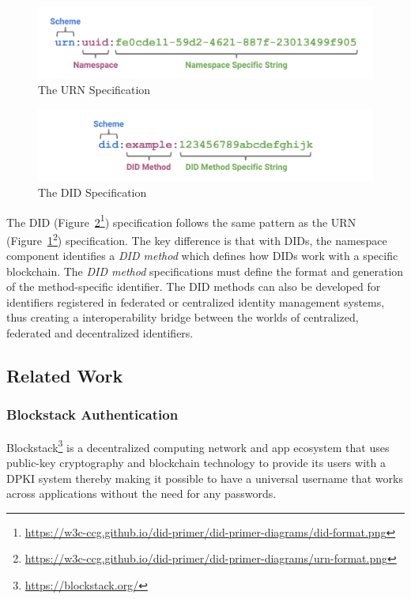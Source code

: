 		\begin{figure}[h]
			\includegraphics[width=\linewidth]{figures/urn-format}
			\caption{\label{fig:urn-format} The URN Specification}
		\end{figure}
	
		\begin{figure}[h]
			\includegraphics[width=\linewidth]{figures/did-format}
			\caption{\label{fig:did-format} The DID Specification}
		\end{figure}
		
		The DID (Figure~\ref{fig:did-format}\footnote{\url{https://w3c-ccg.github.io/did-primer/did-primer-diagrams/did-format.png}}) specification follows the same pattern as the URN (Figure~\ref{fig:urn-format}\footnote{\url{https://w3c-ccg.github.io/did-primer/did-primer-diagrams/urn-format.png}}) specification. The key difference is that with DIDs, the namespace component identifies a \textit{DID method} which defines how DIDs work with a specific blockchain. The \textit{DID method} specifications must define the format and generation of the method-specific identifier. The DID methods can also be developed for identifiers registered in federated or centralized identity management systems, thus creating a interoperability bridge between the worlds of centralized, federated and decentralized identifiers.
	
	\subsection{Related Work}
		\subsubsection{Blockstack Authentication}
		Blockstack\footnote{\url{https://blockstack.org/}} is a decentralized computing network and app ecosystem that uses public-key cryptography and blockchain technology to provide its users with a DPKI system thereby making it possible to have a universal username that works across applications without the need for any passwords.
		
